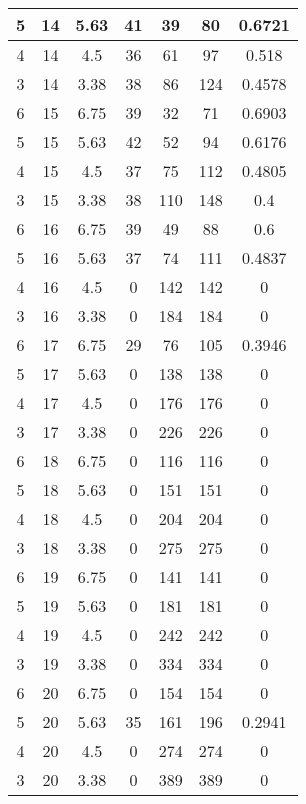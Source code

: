 \documentclass[letterpaper, 12pt]{article}
\begin{document}
\begin{longtable}{|c|c|c|c|c|c|c|}
\hline
5 & 14 & 5.63 & 41 & 39 & 80 & 0.6721 \\
\hline
4 & 14 & 4.5 & 36 & 61 & 97 & 0.518 \\
\hline
3 & 14 & 3.38 & 38 & 86 & 124 & 0.4578 \\
\hline
6 & 15 & 6.75 & 39 & 32 & 71 & 0.6903 \\
\hline
5 & 15 & 5.63 & 42 & 52 & 94 & 0.6176 \\
\hline
4 & 15 & 4.5 & 37 & 75 & 112 & 0.4805 \\
\hline
3 & 15 & 3.38 & 38 & 110 & 148 & 0.4 \\
\hline
6 & 16 & 6.75 & 39 & 49 & 88 & 0.6 \\
\hline
5 & 16 & 5.63 & 37 & 74 & 111 & 0.4837 \\
\hline
4 & 16 & 4.5 & 0 & 142 & 142 & 0 \\
\hline
3 & 16 & 3.38 & 0 & 184 & 184 & 0 \\
\hline
6 & 17 & 6.75 & 29 & 76 & 105 & 0.3946 \\
\hline
5 & 17 & 5.63 & 0 & 138 & 138 & 0 \\
\hline
4 & 17 & 4.5 & 0 & 176 & 176 & 0 \\
\hline
3 & 17 & 3.38 & 0 & 226 & 226 & 0 \\
\hline
6 & 18 & 6.75 & 0 & 116 & 116 & 0 \\
\hline
5 & 18 & 5.63 & 0 & 151 & 151 & 0 \\
\hline
4 & 18 & 4.5 & 0 & 204 & 204 & 0 \\
\hline
3 & 18 & 3.38 & 0 & 275 & 275 & 0 \\
\hline
6 & 19 & 6.75 & 0 & 141 & 141 & 0 \\
\hline
5 & 19 & 5.63 & 0 & 181 & 181 & 0 \\
\hline
4 & 19 & 4.5 & 0 & 242 & 242 & 0 \\
\hline
3 & 19 & 3.38 & 0 & 334 & 334 & 0 \\
\hline
6 & 20 & 6.75 & 0 & 154 & 154 & 0 \\
\hline
5 & 20 & 5.63 & 35 & 161 & 196 & 0.2941 \\
\hline
4 & 20 & 4.5 & 0 & 274 & 274 & 0 \\
\hline
3 & 20 & 3.38 & 0 & 389 & 389 & 0 \\
\hline
\end{longtable}
\end{document}
